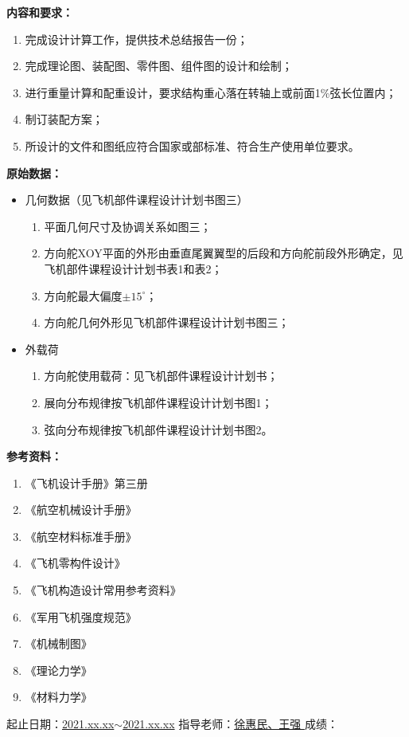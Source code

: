 \begin{spacing}{1.0}
\noindent\textbf{内容和要求：}

\begin{enumerate}
    \item 完成设计计算工作，提供技术总结报告一份；
    \item 完成理论图、装配图、零件图、组件图的设计和绘制；
    \item 进行重量计算和配重设计，要求结构重心落在转轴上或前面1\%弦长位置内；
    \item 制订装配方案；
    \item 所设计的文件和图纸应符合国家或部标准、符合生产使用单位要求。
\end{enumerate}

\noindent\textbf{原始数据：}

\begin{itemize}
    \item 几何数据（见飞机部件课程设计计划书图三）
    \begin{enumerate}
        \item 平面几何尺寸及协调关系如图三；
        \item 方向舵XOY平面的外形由垂直尾翼翼型的后段和方向舵前段外形确定，见飞机部件课程设计计划书表1和表2；
        \item 方向舵最大偏度$\pm 15^{\circ}$；
        \item 方向舵几何外形见飞机部件课程设计计划书图三；
    \end{enumerate}

    \item 外载荷
    \begin{enumerate}
        \item 方向舵使用载荷：见飞机部件课程设计计划书；
        \item 展向分布规律按飞机部件课程设计计划书图1；
        \item 弦向分布规律按飞机部件课程设计计划书图2。
    \end{enumerate}
\end{itemize}

\noindent\textbf{参考资料：}

\begin{enumerate}
    \item 《飞机设计手册》第三册
    \item 《航空机械设计手册》
    \item 《航空材料标准手册》
    \item 《飞机零构件设计》
    \item 《飞机构造设计常用参考资料》
    \item 《军用飞机强度规范》
    \item 《机械制图》
    \item 《理论力学》
    \item 《材料力学》
\end{enumerate}
\end{spacing}

\vspace{0.02\textheight}
\centerline{    
    起止日期：\underline{2021.xx.xx$\sim$2021.xx.xx}
    \quad\quad
    指导老师：\underline{\quad\quad 徐惠民、王强 \quad\quad}
    \quad\quad
    成绩：\underline{\quad\quad\quad\quad\quad\quad\quad\quad}
}